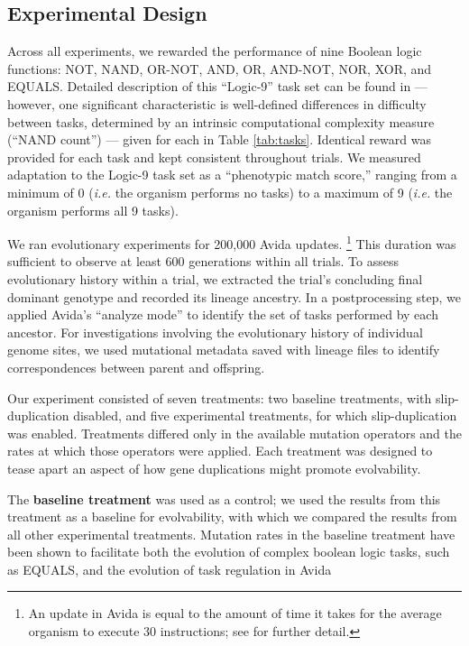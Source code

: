 \subsection{Experimental Design}



Across all experiments, we rewarded the performance of nine Boolean logic functions: NOT, NAND, OR-NOT, AND, OR, AND-NOT, NOR, XOR, and EQUALS.
Detailed description of this ``Logic-9'' task set can be found in \citet{lenski2003evolutionary} ---
however, one significant characteristic is well-defined differences in difficulty between tasks, determined by an intrinsic computational complexity measure (``NAND count'') --- given for each in Table \ref{tab:tasks}.
Identical reward was provided for each task and kept consistent throughout trials.
We measured adaptation to the Logic-9 task set as a ``phenotypic match score,'' ranging from a minimum of 0 (\textit{i.e.} the organism performs no tasks) to a maximum of 9 (\textit{i.e.} the organism performs all 9 tasks).

We ran evolutionary experiments for 200,000 Avida updates.%
\footnote{An update in Avida is equal to the amount of time it takes for the average organism to execute 30 instructions; see \citep{Ofria:2009avida} for further detail.}
This duration was sufficient to observe at least 600 generations within all trials.
To assess evolutionary history within a trial, we extracted the trial's concluding final dominant genotype and recorded its lineage ancestry.
In a postprocessing step, we applied Avida's ``analyze mode'' to identify the set of tasks performed by each ancestor.
For investigations involving the evolutionary history of individual genome sites, we used mutational metadata saved with lineage files to identify correspondences between parent and offspring.

% 

Our experiment consisted of seven treatments: two baseline treatments, with slip-duplication disabled, and five experimental treatments, for which slip-duplication was enabled.
Treatments differed only in the available mutation operators and the rates at which those operators were applied.
Each treatment was designed to tease apart an aspect of how gene duplications might promote evolvability.

The \textbf{baseline treatment} was used as a control; we used the results from this treatment as a baseline for evolvability, with which we compared the results from all other experimental treatments. Mutation rates in the baseline treatment have been shown to facilitate both the evolution of complex boolean logic tasks, such as EQUALS, and the evolution of task regulation in Avida \citep{lenski2003evolutionary, Lalejini:2016plasticity}

